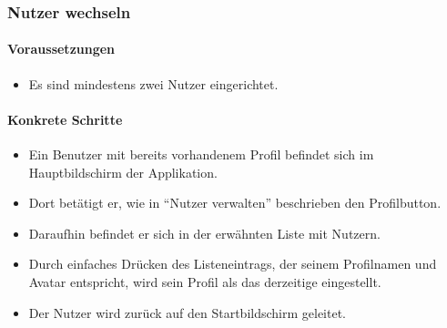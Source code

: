 \subsubsection{Nutzer wechseln}
\paragraph{Voraussetzungen}
\begin{itemize}
\item Es sind mindestens zwei Nutzer eingerichtet.
\end{itemize}

\paragraph{Konkrete Schritte}
\begin{itemize}
\item Ein Benutzer mit bereits vorhandenem Profil befindet sich im Hauptbildschirm der Applikation.
\item Dort betätigt er, wie in "`Nutzer verwalten"' beschrieben den Profilbutton.
\item Daraufhin befindet er sich in der erwähnten Liste mit Nutzern. 
\item Durch einfaches Drücken des Listeneintrags, der seinem Profilnamen und
Avatar entspricht, wird sein Profil als das derzeitige eingestellt.
\item Der Nutzer wird zurück auf den Startbildschirm geleitet.
\end{itemize}
